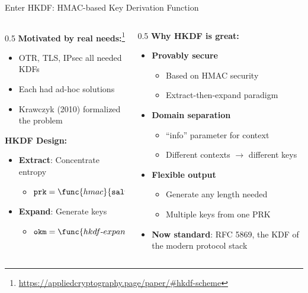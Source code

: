 \ifdefined\PRESENTATION\else\PassOptionsToClass{handout}{beamer}\fi\documentclass[aspectratio=169, lualatex]{beamer}
\begin{document}
\begin{frame}{Enter HKDF: HMAC-based Key Derivation Function}
	\begin{columns}[c]
		\begin{column}{0.5\textwidth}
			\textbf{Motivated by real needs:}\footnote{\url{https://appliedcryptography.page/paper/\#hkdf-scheme}}
			\begin{itemize}
				\item OTR, TLS, IPsec all needed KDFs
				\item Each had ad-hoc solutions
				\item Krawczyk (2010) formalized the problem
			\end{itemize}
			\textbf{HKDF Design:}
			\begin{itemize}
				\item \textbf{Extract}: Concentrate entropy
				      \begin{itemize}
					      \item $\texttt{prk} = \func{hmac}{\texttt{salt}, \texttt{ikm}}$
				      \end{itemize}
				\item \textbf{Expand}: Generate keys
				      \begin{itemize}
					      \item $\texttt{okm} = \func{hkdf\text{-}expand}{\texttt{prk}, \texttt{info}, \texttt{len}}$
				      \end{itemize}
			\end{itemize}
		\end{column}
		\begin{column}{0.5\textwidth}
			\textbf{Why HKDF is great:}
			\begin{itemize}
				\item \textbf{Provably secure}
				      \begin{itemize}
					      \item Based on HMAC security
					      \item Extract-then-expand paradigm
				      \end{itemize}
				\item \textbf{Domain separation}
				      \begin{itemize}
					      \item ``info'' parameter for context
					      \item Different contexts $\rightarrow$ different keys
				      \end{itemize}
				\item \textbf{Flexible output}
				      \begin{itemize}
					      \item Generate any length needed
					      \item Multiple keys from one PRK
				      \end{itemize}
				\item \textbf{Now standard}: RFC 5869, the KDF of the modern protocol stack
			\end{itemize}
		\end{column}
	\end{columns}
\end{frame}
\end{document}
